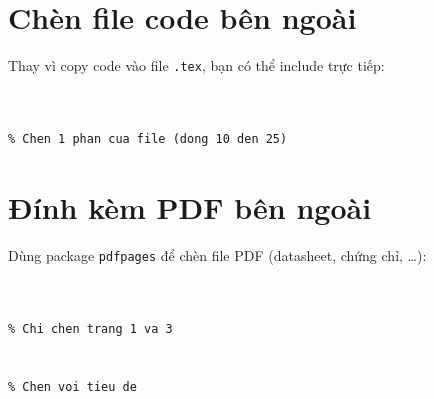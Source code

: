 \section{Chèn file code bên ngoài}

Thay vì copy code vào file \texttt{.tex}, bạn có thể include trực tiếp:

\begin{lstlisting}[style=latexstyle, caption={Chèn file code bên ngoài}]
% Chen file Python


% Chen 1 phan cua file (dong 10 den 25)

\end{lstlisting}

\section{Đính kèm PDF bên ngoài}

Dùng package \texttt{pdfpages} để chèn file PDF (datasheet, chứng chỉ, \ldots):

\begin{lstlisting}[style=latexstyle, caption={Chèn file PDF bên ngoài}]
% Chen tat ca cac trang cua file PDF


% Chi chen trang 1 va 3


% Chen voi tieu de

\end{lstlisting}
